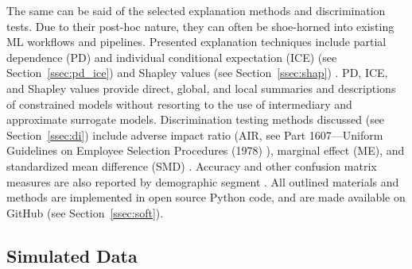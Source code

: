 \documentclass[information,article,accept,moreauthors,pdftex]{Definitions/mdpi}
\begin{document}
The same can be said of the selected explanation methods and discrimination tests. Due to their post-hoc nature, they can often be shoe-horned into existing ML workflows and pipelines. Presented explanation techniques include partial dependence (PD) and individual conditional expectation (ICE) (see Section~\ref{ssec:pd_ice}) and Shapley values (see Section~\ref{ssec:shap}) \cite{esl,ice_plots,shapley,tree_shap}. PD, ICE, and Shapley values provide direct, global, and local summaries and descriptions of constrained models without resorting to the use of intermediary and approximate surrogate models. Discrimination testing methods discussed (see Section~\ref{ssec:di}) include adverse impact ratio
(AIR, see Part 1607---Uniform Guidelines on Employee Selection Procedures (1978) ), 
marginal effect (ME), and standardized mean difference (SMD)  \cite{feldman2015certifying,cohen1988statistical,cohen1992power}.
Accuracy and other confusion matrix measures are also reported by demographic segment \cite{zafar2017fairness}. All outlined materials and methods are implemented in open source Python code, and are made available on GitHub (see Section~\ref{ssec:soft}). 


\subsection{Simulated Data}\label{ssec:sim_data}
\end{document}
